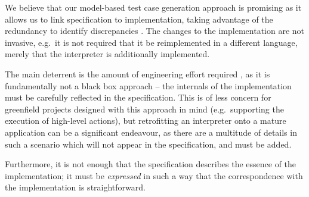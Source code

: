 \documentclass[a4paper]{article}
\begin{document}
We believe that our model-based test case generation approach is promising as it allows us to link specification to implementation, taking advantage of the redundancy to identify discrepancies \cite{fonseca2017empirical}.
%
The changes to the implementation are not invasive, e.g.~it is not required that it be reimplemented in a different language, merely that the interpreter is additionally implemented.

The main deterrent is the amount of engineering effort required \cite{Davis_2020}, as it is fundamentally not a black box approach -- the internals of the implementation must be carefully reflected in the specification.
%
This is of less concern for greenfield projects designed with this approach in mind (e.g.~supporting the execution of high-level actions), but retrofitting an interpreter onto a mature application can be a significant endeavour, as there are a multitude of details in such a scenario which will not appear in the specification, and must be added.

Furthermore, it is not enough that the specification describes the essence of the implementation; it must be \emph{expressed} in such a way that the correspondence with the implementation is straightforward.

\printbibliography
\end{document}
